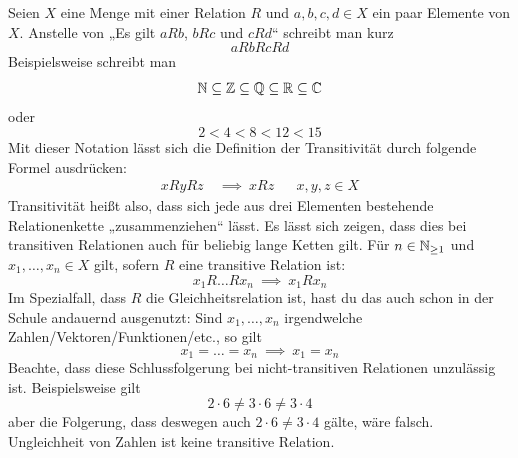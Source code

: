 \begin{bem} \label{kettenfalten}
    Seien $X$ eine Menge mit einer Relation $R$ und $a,b,c,d\in X$ ein paar Elemente von $X$. Anstelle von „Es gilt $aRb$, $bRc$ und $cRd$“ schreibt man kurz
        \[ aRbRcRd \]
    Beispielsweise schreibt man
        \[ \mathbb N \subseteq \mathbb Z\subseteq\mathbb Q\subseteq\mathbb R\subseteq \mathbb C \]
    oder
        \[ 2 < 4 < 8 < 12 < 15 \]
    Mit dieser Notation lässt sich die Definition der Transitivität durch folgende Formel ausdrücken:
    \begin{align*}
        xRyRz \ &\implies\ xRz && x,y,z\in X
    \end{align*}
    Transitivität heißt also, dass sich jede aus drei Elementen bestehende Relationenkette „zusammenziehen“ lässt. Es lässt sich zeigen, dass dies bei transitiven Relationen auch für beliebig lange Ketten gilt. Für $n\in \mathbb N_{\ge 1}$ und $x_1,\dots , x_n\in X$ gilt, sofern $R$ eine transitive Relation ist:
        \[ x_1R \ldots Rx_n \ \implies\ x_1Rx_n\]
    Im Spezialfall, dass $R$ die Gleichheitsrelation ist, hast du das auch schon in der Schule andauernd ausgenutzt: Sind $x_1,\dots , x_n$ irgendwelche Zahlen/Vektoren/Funktionen/etc., so gilt
        \[ x_1=\ldots = x_n \ \implies\ x_1=x_n\]
    Beachte, dass diese Schlussfolgerung bei nicht-transitiven Relationen unzulässig ist. Beispielsweise gilt
        \[ 2\cdot 6 \neq 3\cdot 6\neq 3\cdot 4 \]
    aber die Folgerung, dass deswegen auch $2\cdot 6\neq 3\cdot 4$ gälte, wäre falsch. Ungleichheit von Zahlen ist keine transitive Relation.
\end{bem}


